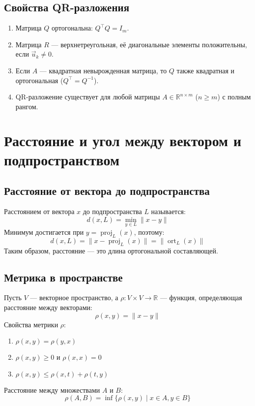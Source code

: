 \documentclass[12pt]{article}
\begin{document}
\subsection*{Свойства QR-разложения}

\begin{enumerate}
    \item Матрица $Q$ ортогональна: $Q^\top Q = I_m$.
    \item Матрица $R$ — верхнетреугольная, её диагональные элементы положительны, если $\vec{u}_k \neq 0$.
    \item Если $A$ — квадратная невырожденная матрица, то $Q$ также квадратная и ортогональная ($Q^\top = Q^{-1}$).
    \item QR-разложение существует для любой матрицы $A \in \mathbb{R}^{n \times m}$ ($n \geq m$) с полным рангом.
\end{enumerate}

\section{Расстояние и угол между вектором и подпространством}

\subsection{Расстояние от вектора до подпространства}
Расстоянием от вектора $x$ до подпространства $L$ называется:
\[
d(x, L) = \min_{y \in L} \|x - y\|
\]
Минимум достигается при $y = \operatorname{proj}_L(x)$, поэтому:
\[
d(x, L) = \|x - \operatorname{proj}_L(x)\| = \|\operatorname{ort}_L(x)\|
\]
Таким образом, расстояние — это длина ортогональной составляющей.

\subsection{Метрика в пространстве}
Пусть $V$ — векторное пространство, а $\rho: V \times V \to \mathbb{R}$ — функция, определяющая расстояние между векторами:
\[
\rho(x, y) = \|x - y\|
\]
Свойства метрики $\rho$:
\begin{enumerate}
    \item $\rho(x, y) = \rho(y, x)$
    \item $\rho(x, y) \geq 0$ и $\rho(x, x) = 0$
    \item $\rho(x, y) \leq \rho(x, t) + \rho(t, y)$
\end{enumerate}
Расстояние между множествами $A$ и $B$:
\[
\rho(A, B) = \inf \{ \rho(x, y) \mid x \in A, y \in B \}
\]
\end{document}

